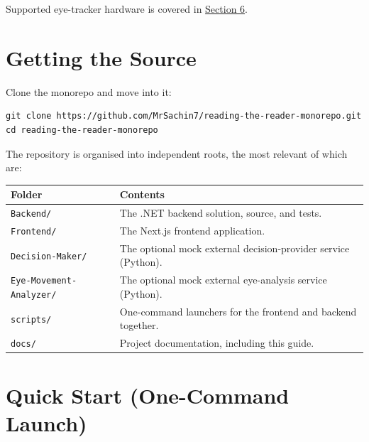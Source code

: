 Supported eye-tracker hardware is covered in \hyperref[6-tobii-eye-tracker-setup]{Section 6}.

\FloatBarrier
\section{Getting the Source}\label{3-getting-the-source}

Clone the monorepo and move into it:

\begin{Verbatim}[breaklines=true,breakanywhere=true,fontsize=\small]
git clone https://github.com/MrSachin7/reading-the-reader-monorepo.git
cd reading-the-reader-monorepo
\end{Verbatim}

The repository is organised into independent roots, the most relevant of which are:

{\small{} %
\begin{longtable}[]{@{}
  >{\raggedright\arraybackslash}p{}
  >{\raggedright\arraybackslash}p{}@{}}
\toprule\noalign{}
\begin{minipage}[b]{\linewidth}\raggedright
Folder
\end{minipage} & \begin{minipage}[b]{\linewidth}\raggedright
Contents
\end{minipage} \\
\midrule\noalign{}
\endhead
\bottomrule\noalign{}
\endlastfoot
\texttt{Backend/} & The .NET backend solution, source, and tests. \\
\texttt{Frontend/} & The Next.js frontend application. \\
\texttt{Decision-Maker/} & The optional mock external decision-provider service (Python). \\
\texttt{Eye-Movement-Analyzer/} & The optional mock external eye-analysis service (Python). \\
\texttt{scripts/} & One-command launchers for the frontend and backend together. \\
\texttt{docs/} & Project documentation, including this guide. \\
\end{longtable}
}

\FloatBarrier
\section{Quick Start (One-Command Launch)}\label{4-quick-start-one-command-launch}

